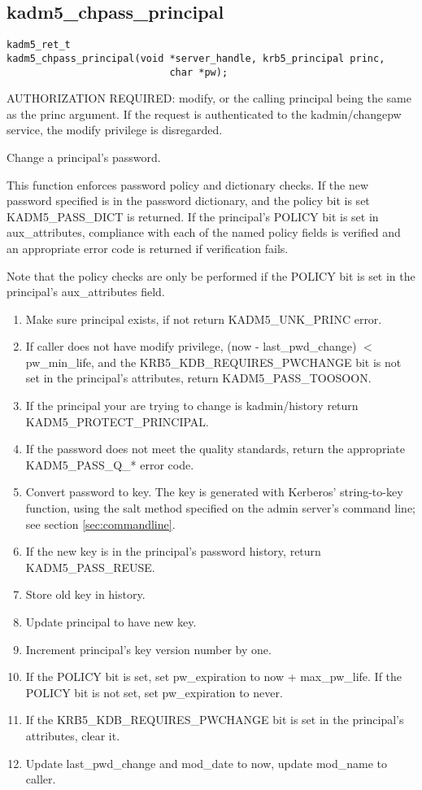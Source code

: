 \subsection{kadm5_chpass_principal}

\begin{verbatim}
kadm5_ret_t
kadm5_chpass_principal(void *server_handle, krb5_principal princ,
                            char *pw);
\end{verbatim}

AUTHORIZATION REQUIRED: modify, or the calling principal being the
same as the princ argument.  If the request is authenticated to the
kadmin/changepw service, the modify privilege is disregarded.

Change a principal's password.  

This function enforces password policy and dictionary checks.  If the new
password specified is in the password dictionary, and the policy bit is set
KADM5_PASS_DICT is returned.  If the principal's POLICY bit is set in
aux_attributes, compliance with each of the named policy fields is verified
and an appropriate error code is returned if verification fails.

Note that the policy checks are only be performed if the POLICY bit is
set in the principal's aux_attributes field.

\begin{enumerate}
\item Make sure principal exists, if not return KADM5_UNK_PRINC error.
\item If caller does not have modify privilege, (now - last_pwd_change) $<$
pw_min_life, and the KRB5_KDB_REQUIRES_PWCHANGE bit is not set in the
principal's attributes, return KADM5_PASS_TOOSOON.
\item If the principal your are trying to change is kadmin/history
return KADM5_PROTECT_PRINCIPAL.
\item If the password does not meet the quality
standards, return the appropriate KADM5_PASS_Q_* error code.
\item Convert password to key.  The key is generated with
Kerberos' string-to-key function, using the salt method specified on
the admin server's command line; see section \ref{sec:commandline}.
\item If the new key is in the principal's password history, return
KADM5_PASS_REUSE.
\item Store old key in history.
\item Update principal to have new key.
\item Increment principal's key version number by one.
\item If the POLICY bit is set, set pw_expiration to now +
max_pw_life.  If the POLICY bit is not set, set pw_expiration to
never.
\item If the KRB5_KDB_REQUIRES_PWCHANGE bit is set in the principal's
attributes, clear it.
\item Update last_pwd_change and mod_date to now, update mod_name to
caller.
\end{enumerate}

